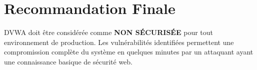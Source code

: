 \documentclass[12pt,a4paper,openany]{report}
\begin{document}
	\section{Recommandation Finale}
	
	DVWA doit être considérée comme \textbf{NON SÉCURISÉE} pour tout environnement de production. 
	Les vulnérabilités identifiées permettent une compromission complète du système en quelques minutes 
	par un attaquant ayant une connaissance basique de sécurité web.
	
\end{document}
